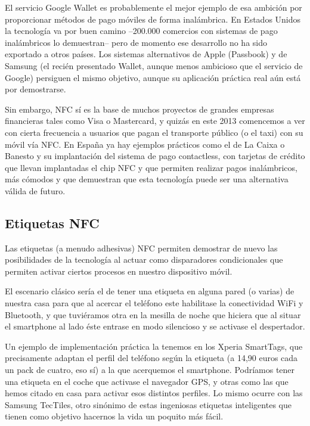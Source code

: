 El servicio Google Wallet es probablemente el mejor ejemplo de esa ambición por proporcionar métodos de pago móviles de forma inalámbrica. En Estados Unidos la tecnología va por buen camino --200.000 comercios con sistemas de pago inalámbricos lo demuestran-- pero de momento ese desarrollo no ha sido exportado a otros países. Los sistemas alternativos de Apple (Passbook) y de Samsung (el recién presentado Wallet, aunque menos ambicioso que el servicio de Google) persiguen el mismo objetivo, aunque su aplicación práctica real aún está por demostrarse.

Sin embargo, NFC sí es la base de muchos proyectos de grandes empresas financieras tales como Visa o Mastercard, y quizás en este 2013 comencemos a ver con cierta frecuencia a usuarios que pagan el transporte público (o el taxi) con su móvil vía NFC. En España ya hay ejemplos prácticos como el de La Caixa o Banesto y su implantación del sistema de pago contactless, con tarjetas de crédito que llevan implantadas el chip NFC y que permiten realizar pagos inalámbricos, más cómodos y que demuestran que esta tecnología puede ser una alternativa válida de futuro. 

\subsection{Etiquetas NFC}
Las etiquetas (a menudo adhesivas) NFC permiten demostrar de nuevo las posibilidades de la tecnología al actuar como disparadores condicionales que permiten activar ciertos procesos en nuestro dispositivo móvil.

El escenario clásico sería el de tener una etiqueta en alguna pared (o varias) de nuestra casa para que al acercar el teléfono este habilitase la conectividad WiFi y Bluetooth, y que tuviéramos otra en la mesilla de noche que hiciera que al situar el smartphone al lado éste entrase en modo silencioso y se activase el despertador.

Un ejemplo de implementación práctica la tenemos en los Xperia SmartTags, que precisamente adaptan el perfil del teléfono según la etiqueta (a 14,90 euros cada un pack de cuatro, eso sí) a la que acerquemos el smartphone. Podríamos tener una etiqueta en el coche que activase el navegador GPS, y otras como las que hemos citado en casa para activar esos distintos perfiles. Lo mismo ocurre con las Samsung TecTiles, otro sinónimo de estas ingeniosas etiquetas inteligentes que tienen como objetivo hacernos la vida un poquito más fácil.

